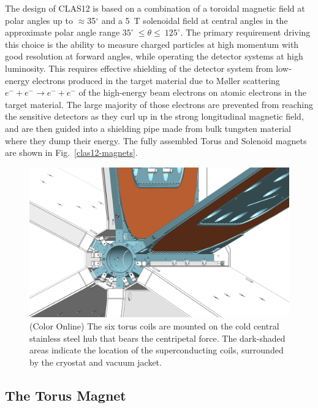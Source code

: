 \documentclass[final,3p,twocolumn]{elsarticle}
\begin{document}
The design of CLAS12 is based on a combination of a toroidal magnetic field at polar angles up to $\approx$35$^\circ$
and a 5~T solenoidal field at central angles in the approximate polar angle range $35^\circ~\le \theta \le~125^\circ$.
The primary requirement driving this choice is the ability to measure charged particles at high momentum with good
resolution at forward angles, while operating the detector systems at high luminosity. This requires effective
shielding of the detector system from low-energy electrons produced in the target material due to M{\o}ller
scattering $e^- + e^- \to e^- + e^-$ of the high-energy beam electrons on atomic electrons in the target material.
The large majority of those electrons are prevented from reaching the sensitive detectors as they curl up in the
strong longitudinal magnetic field, and are then guided into a shielding pipe made from bulk tungsten material where
they dump their energy. The fully assembled Torus and Solenoid magnets are shown in Fig.~\ref{clas12-magnets}.
\begin{figure}[b!]
\centerline{\includegraphics[width=1.00\columnwidth]{torus-hub-2.png}}
\caption{(Color Online) The six torus coils are mounted on the cold central stainless steel hub that bears the centripetal force. The
dark-shaded areas indicate the location of the superconducting coils, surrounded by the cryostat and vacuum jacket.}
\label{coil-mount}
\end{figure}


\subsection{The Torus Magnet}
\label{torus}
\end{document}
